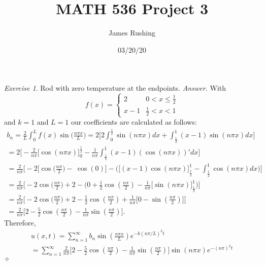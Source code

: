 \documentclass[12pt,oneside]{amsart}
\title{MATH 536 Project 3}
\author{James Rushing}
\date{03/20/20}
\theoremstyle{definition}
\theoremstyle{remark}
\newtheorem{exer}{Exercise}
\numberwithin{equation}{exer}
\newenvironment{answer}{\bigskip\noindent\emph{Answer.}}{\hfill$\diamond$\newline}
\begin{document}
\maketitle
\begin{exer} 
Rod with zero temperature at the endpoints.\newline
\begin{answer}
With 
\begin{equation*}
    f(x) = \begin{cases}
               2               & 0 < x \leq \frac{1}{2}\\
               x-1               & \frac{1}{2} <x <1
           \end{cases}
\end{equation*}
and $k=1$ and $L=1$ our coefficients are calculated as follows:
\begin{align*}
    b_n = \frac{2}{L}\int_{0}^{L} f(x) \sin \big(\frac{n \pi x}{L}\big) = 
    2\Bigg[2\int_{0}^{\frac{1}{2}} \sin (n \pi x) dx +\int_{\frac{1}{2}}^{1} (x-1) \sin (n \pi x) dx \Bigg]\\
    = 2 \Bigg[-\frac{2}{n \pi} \Big[\cos(n \pi x)\Big]_0^{\frac{1}{2}} - \frac{1}{n \pi} \int_{\frac{1}{2}}^1 (x-1)( \cos (n \pi x))' dx \Bigg]\\
    =\frac{2}{n \pi}\Bigg[ -2 \Big[ \cos\big(\frac{n \pi}{2}\big) - \ \cos(0)\Big] - \Bigg( \Big[(x-1)\cos (n \pi x) \Big]_{\frac{1}{2}}^1 - \int_{\frac{1}{2}}^1 \cos(n \pi x) dx \Bigg) \Bigg]\\
    = \frac{2}{n \pi}\Bigg[ -2\cos(\frac{n \pi}{2}\big) + 2 - \Bigg(0 + \frac{1}{2} \cos(\frac{n \pi}{2})- \frac{1}{n \pi}\Big[\sin(n \pi x)\Big]_{\frac{1}{2}}^1\Bigg)\Bigg] \\
    =\frac{2}{n \pi}\Bigg[ -2\cos(\frac{n \pi}{2}\big) + 2 - \frac{1}{2} \cos(\frac{n \pi}{2}) + \frac{1}{n \pi}\Big[0 - \sin (\frac{n \pi}{2})\Big]
    \Bigg]\\
    =\frac{2}{n \pi}\Bigg[2 -\frac{5}{2}\cos(\frac{n \pi}{2}) - \frac{1}{n \pi}\sin (\frac{n \pi}{2})\Bigg].
\end{align*}
\indent\newline
Therefore, 
\begin{align*}
    u(x,t) = \sum_{n=1}^{\infty} b_n \sin (\frac{n \pi x}{L}) e^{-k(n \pi / L)^2t}\\
    = \sum_{n=1}^{\infty}     \frac{2}{n \pi}\Bigg[2 -\frac{5}{2}\cos(\frac{n \pi}{2}) - \frac{1}{n \pi}\sin (\frac{n \pi}{2})\Bigg] \sin (n \pi x) e^{-(n \pi)^2t}
\end{align*}
\end{answer}
\end{exer}
\end{document}
